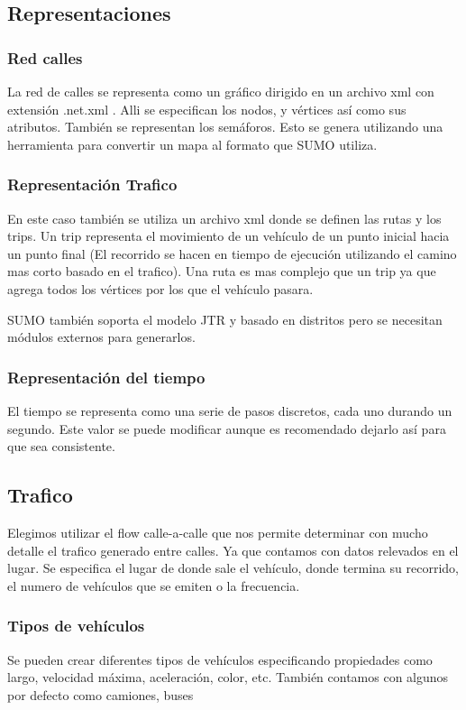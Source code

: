 \subsection{Representaciones}

\subsubsection{Red calles}
La red de calles se representa como un gráfico dirigido en un archivo xml con extensión .net.xml . Alli se especifican los nodos, y vértices así como sus atributos. También se representan los semáforos. Esto  se genera utilizando una herramienta  para convertir un mapa al formato que SUMO utiliza.

\subsubsection{Representación Trafico}
En este caso también se utiliza un archivo xml donde se definen las rutas y los trips. Un trip representa el movimiento de un vehículo de un punto inicial hacia un punto final (El recorrido se hacen en tiempo de ejecución utilizando el camino mas corto basado en el trafico). Una ruta es mas complejo que un trip ya que agrega todos los vértices por los que el vehículo pasara.

SUMO también soporta el modelo JTR y basado en distritos pero se necesitan módulos externos para generarlos.

\subsubsection{Representación del tiempo}
El tiempo se representa como una serie de pasos discretos, cada uno durando un segundo. Este valor se puede modificar aunque es recomendado dejarlo así para que sea consistente.

\subsection{Trafico}
Elegimos utilizar el flow calle-a-calle que nos permite determinar con mucho detalle el trafico generado entre calles. Ya que contamos con datos relevados en el lugar. Se especifica el lugar de donde sale el vehículo, donde termina su recorrido, el numero de vehículos que se emiten o la frecuencia.

\subsubsection{Tipos de vehículos}
Se pueden crear diferentes tipos de vehículos especificando propiedades como largo, velocidad máxima,  aceleración, color, etc. También contamos con algunos por defecto como camiones, buses

